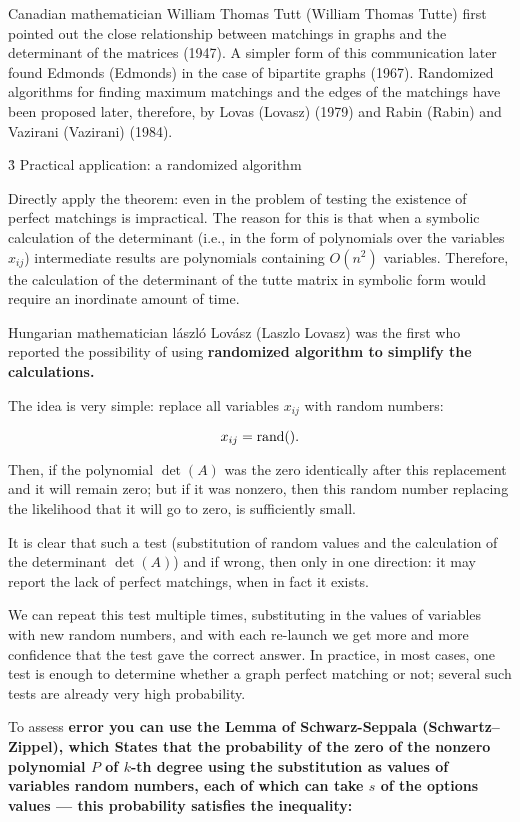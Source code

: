 Canadian mathematician William Thomas Tutt (William Thomas Tutte) first pointed out the close relationship between matchings in graphs and the determinant of the matrices (1947). A simpler form of this communication later found Edmonds (Edmonds) in the case of bipartite graphs (1967). Randomized algorithms for finding maximum matchings and the edges of the matchings have been proposed later, therefore, by Lovas (Lovasz) (1979) and Rabin (Rabin) and Vazirani (Vazirani) (1984).


\h3{ Practical application: a randomized algorithm }

Directly apply the theorem: even in the problem of testing the existence of perfect matchings is impractical. The reason for this is that when a symbolic calculation of the determinant (i.e., in the form of polynomials over the variables $x_{ij}$) intermediate results are polynomials containing $O(n^2)$ variables. Therefore, the calculation of the determinant of the tutte matrix in symbolic form would require an inordinate amount of time.

Hungarian mathematician lászló Lovász (Laszlo Lovasz) was the first who reported the possibility of using \bf{randomized} algorithm to simplify the calculations.

The idea is very simple: replace all variables $x_{ij}$ with random numbers:

$$ x_{ij} = {\rm rand}(). $$

Then, if the polynomial $\det(A)$ was the zero identically after this replacement and it will remain zero; but if it was nonzero, then this random number replacing the likelihood that it will go to zero, is sufficiently small.

It is clear that such a test (substitution of random values and the calculation of the determinant $\det(A)$) and if wrong, then only in one direction: it may report the lack of perfect matchings, when in fact it exists.

We can repeat this test multiple times, substituting in the values of variables with new random numbers, and with each re-launch we get more and more confidence that the test gave the correct answer. In practice, in most cases, one test is enough to determine whether a graph perfect matching or not; several such tests are already very high probability.

To assess \bf{error} you can use the Lemma of Schwarz-Seppala (Schwartz–Zippel), which States that the probability of the zero of the nonzero polynomial $P$ of $k$-th degree using the substitution as values of variables random numbers, each of which can take $s$ of the options values --- this probability satisfies the inequality:

